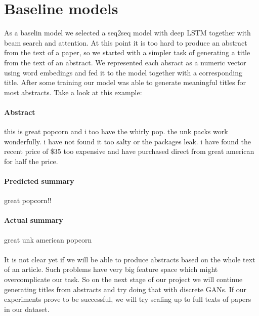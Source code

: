 \documentclass[sigplan]{acmart}
\begin{document}
\section{Baseline models}

As a baselin model we selected a seq2seq model with deep LSTM\cite{sutskever-17} together with beam search and attention. At this point it is too hard to produce an abstract from the text of a paper, so we started with a simpler task of generating a title from the text of an abstract. We represented each absract as a numeric vector using word embedings and fed it to the model together with a corresponding title. After some training our model was able to generate meaningful titles for most abstracts. Take a look at this example:

\paragraph{Abstract} this is great popcorn and i too have the whirly pop. the unk packs work wonderfully. i have not found it too salty or the packages leak. i have found the recent price of \$35 too expensive and have purchased direct from great american for half the price.

\paragraph{Predicted summary} great popcorn!!

\paragraph{Actual summary} great unk american popcorn

\paragraph{} It is not clear yet if we will be able to produce abstracts based on the whole text of an article. Such problems have very big feature space which might overcomplicate our task. So on the next stage of our project we will continue generating titles from abstracts and try doing that with discrete GANs. If our experiments prove to be successful, we will try scaling up to full texts of papers in our dataset.

\end{document}
